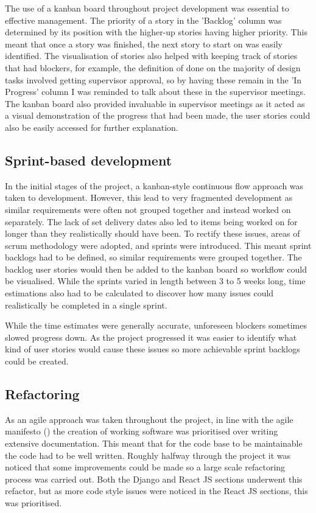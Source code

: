 \documentclass[l4proj.tex]{subfiles}
\begin{document}
The use of a kanban board throughout project development was essential to effective management. The priority of a story in the 'Backlog' column was determined by its position with the higher-up stories having higher priority. This meant that once a story was finished, the next story to start on was easily identified. The visualisation of stories also helped with keeping track of stories that had blockers, for example, the definition of done on the majority of design tasks involved getting supervisor approval, so by having these remain in the 'In Progress' column I was reminded to talk about these in the supervisor meetings. The kanban board also provided invaluable in supervisor meetings as it acted as a visual demonstration of the progress that had been made, the user stories could also be easily accessed for further explanation.


\subsection{Sprint-based development}
In the initial stages of the project, a kanban-style continuous flow approach was taken to development. However, this lead to very fragmented development as similar requirements were often not grouped together and instead worked on separately. The lack of set delivery dates also led to items being worked on for longer than they realistically should have been. To rectify these issues, areas of scrum methodology were adopted, and sprints were introduced. This meant sprint backlogs had to be defined, so similar requirements were grouped together. The backlog user stories would then be added to the kanban board so workflow could be visualised. While the sprints varied in length between 3 to 5 weeks long, time estimations also had to be calculated to discover how many issues could realistically be completed in a single sprint. 

While the time estimates were generally accurate, unforeseen blockers sometimes slowed progress down. As the project progressed it was easier to identify what kind of user stories would cause these issues so more achievable sprint backlogs could be created. 


\subsection{Refactoring}
 As an agile approach was taken throughout the project, in line with the agile manifesto (\cite{Kent2001(manifesto)}) the creation of working software was prioritised over writing extensive documentation. This meant that for the code base to be maintainable the code had to be well written. Roughly halfway through the project it was noticed that some improvements could be made so a large scale refactoring process was carried out. Both the Django and React JS sections underwent this refactor, but as more code style issues were noticed in the React JS sections, this was prioritised.
\end{document}
